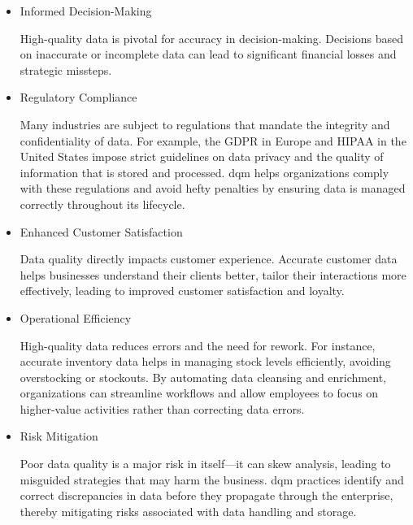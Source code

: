 \begin{itemize}
    \item   Informed Decision-Making
    
    High-quality data is pivotal for accuracy in decision-making. Decisions based on inaccurate or incomplete data can lead to significant financial losses and strategic missteps.

    \item   Regulatory Compliance
    
    Many industries are subject to regulations that mandate the integrity and confidentiality of data. For example, the GDPR in Europe and HIPAA in the United States impose strict guidelines on data privacy and the quality of information that is stored and processed.
        \acrshort{dqm} helps organizations comply with these regulations and avoid hefty penalties by ensuring data is managed correctly throughout its lifecycle.

    \item   Enhanced Customer Satisfaction

    Data quality directly impacts customer experience. Accurate customer data helps businesses understand their clients better, tailor their interactions more effectively, leading to improved customer satisfaction and loyalty.

    \item Operational Efficiency
    
    High-quality data reduces errors and the need for rework. For instance, accurate inventory data helps in managing stock levels efficiently, avoiding overstocking or stockouts.
    By automating data cleansing and enrichment, organizations can streamline workflows and allow employees to focus on higher-value activities rather than correcting data errors.    

    \item     Risk Mitigation

    Poor data quality is a major risk in itself—it can skew analysis, leading to misguided strategies that may harm the business.
    \acrshort{dqm} practices identify and correct discrepancies in data before they propagate through the enterprise, thereby mitigating risks associated with data handling and storage.

\end{itemize}




